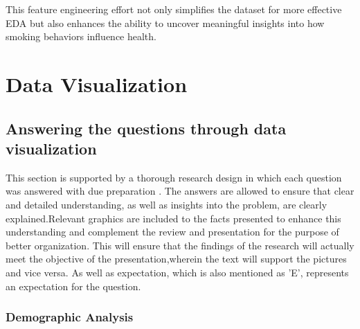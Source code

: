 \documentclass[12pt]{article}
\begin{document}
This feature engineering effort not only simplifies the dataset for more effective EDA but also enhances the ability to uncover meaningful insights into how smoking behaviors influence health.
\newpage


\section{Data Visualization}

\subsection{Answering the questions through data visualization} 
This section is supported by a thorough research design in which each
question was answered with due preparation . The answers are allowed to
ensure that clear and detailed understanding, as well as insights into the
problem, are clearly explained.Relevant graphics are included to the facts
presented to enhance this understanding and complement the review and
presentation for the purpose of better organization. This will ensure that the findings of the research will actually meet the objective of the presentation,wherein the text will support the pictures and vice versa. As well as expectation, which is also mentioned as 'E', represents an expectation for the question.

\subsubsection{Demographic Analysis}
\end{document}
